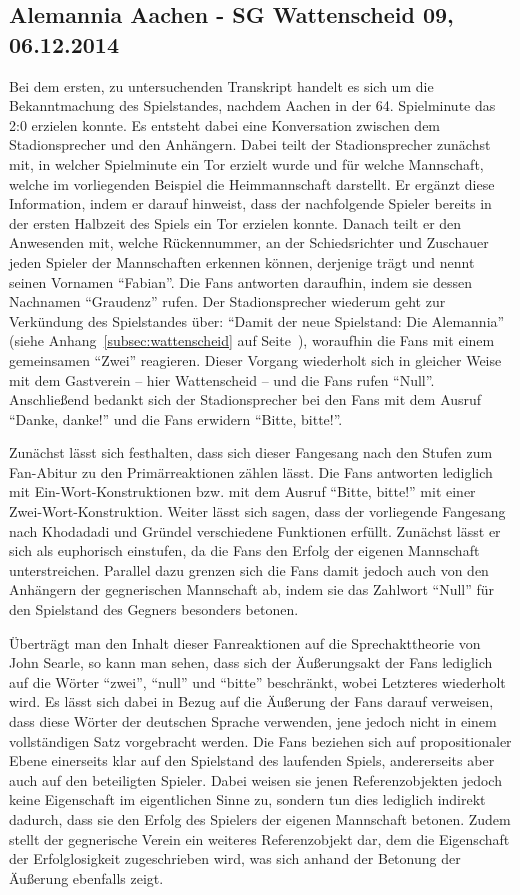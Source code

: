 \subsection{Alemannia Aachen - SG Wattenscheid 09, 06.12.2014}
Bei dem ersten, zu untersuchenden Transkript handelt es sich um die Bekanntmachung des Spielstandes, nachdem Aachen in der 64. Spielminute das 2:0 erzielen konnte.
Es entsteht dabei eine Konversation zwischen dem Stadionsprecher und den Anhängern.
Dabei teilt der Stadionsprecher zunächst mit, in welcher Spielminute ein Tor erzielt wurde und für welche Mannschaft, welche im vorliegenden Beispiel die Heimmannschaft darstellt.
Er ergänzt diese Information, indem er darauf hinweist, dass der nachfolgende Spieler bereits in der ersten Halbzeit des Spiels ein Tor erzielen konnte.
Danach teilt er den Anwesenden mit, welche Rückennummer, an der Schiedsrichter und Zuschauer jeden Spieler der Mannschaften erkennen können, derjenige trägt und nennt seinen Vornamen "`Fabian"'.
Die Fans antworten daraufhin, indem sie dessen Nachnamen "`Graudenz"' rufen.
Der Stadionsprecher wiederum geht zur Verkündung des Spielstandes über: "`Damit der neue Spielstand: Die Alemannia"' (siehe Anhang~\ref{subsec:wattenscheid} auf Seite~\pageref{subsec:wattenscheid}), woraufhin die Fans mit einem gemeinsamen "`Zwei"' reagieren.
Dieser Vorgang wiederholt sich in gleicher Weise mit dem Gastverein – hier Wattenscheid – und die Fans rufen "`Null"'.
Anschließend bedankt sich der Stadionsprecher bei den Fans mit dem Ausruf "`Danke, danke!"' und die Fans erwidern "`Bitte, bitte!"'.

Zunächst lässt sich festhalten, dass sich dieser Fangesang nach den Stufen zum Fan-Abitur zu den Primärreaktionen zählen lässt.
Die Fans antworten lediglich mit Ein-Wort-Konstruktionen bzw. mit dem Ausruf "`Bitte, bitte!"' mit einer Zwei-Wort-Konstruktion.
Weiter lässt sich sagen, dass der vorliegende Fangesang nach Khodadadi und Gründel verschiedene Funktionen erfüllt.
Zunächst lässt er sich als euphorisch einstufen, da die Fans den Erfolg der eigenen Mannschaft unterstreichen.
Parallel dazu grenzen sich die Fans damit jedoch auch von den Anhängern der gegnerischen Mannschaft ab, indem sie das Zahlwort "`Null"' für den Spielstand des Gegners besonders betonen.

Überträgt man den Inhalt dieser Fanreaktionen auf die Sprechakttheorie von John Searle, so kann man sehen, dass sich der Äußerungsakt der Fans lediglich auf die Wörter "`zwei"', "`null"' und "`bitte"' beschränkt, wobei Letzteres wiederholt wird.
Es lässt sich dabei in Bezug auf die Äußerung der Fans darauf verweisen, dass diese Wörter der deutschen Sprache verwenden, jene jedoch nicht in einem vollständigen Satz vorgebracht werden.
Die Fans beziehen sich auf propositionaler Ebene einerseits klar auf den Spielstand des laufenden Spiels, andererseits aber auch auf den beteiligten Spieler.
Dabei weisen sie jenen Referenzobjekten jedoch keine Eigenschaft im eigentlichen Sinne zu, sondern tun dies lediglich indirekt dadurch, dass sie den Erfolg des Spielers der eigenen Mannschaft betonen.
Zudem stellt der gegnerische Verein ein weiteres Referenzobjekt dar, dem die Eigenschaft der Erfolglosigkeit zugeschrieben wird, was sich anhand der Betonung der Äußerung ebenfalls zeigt.

